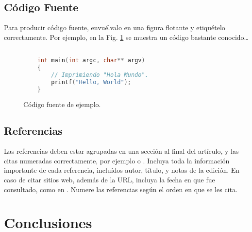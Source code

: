 \documentclass[a4paper,10pt,twocolumn]{article}
\begin{document}
	\subsection{Código Fuente}\label{sub:listings}
		Para producir código fuente, envuélvalo en una figura flotante y
		etiquételo correctamente. Por ejemplo, en la Fig. \ref{fig:code}
		se muestra un código bastante conocido\ldots


		\begin{figure}[htb]%
			\begin{lstlisting}[language=c]%

    int main(int argc, char** argv)
    {
        // Imprimiendo "Hola Mundo".
        printf("Hello, World");
    }

			\end{lstlisting}
		\caption{Código fuente de ejemplo.\label{fig:code}}
		\end{figure}

	\subsection{Referencias}
  	Las referencias deben estar agrupadas en una sección al final del artículo,
  	y las citas numeradas correctamente, por ejemplo \cite{knuth} o \cite{goedel}.
  	Incluya toda la información importante de cada referencia, incluídos autor,
  	título, y notas de la edición. En caso de citar sitios web, además
  	de la URL, incluya la fecha en que fue consultado, como en \cite{wiki}. Numere 
  	las referencias según el orden en que se les cita.




\section{Conclusiones}\label{sec:conc}
\end{document}
